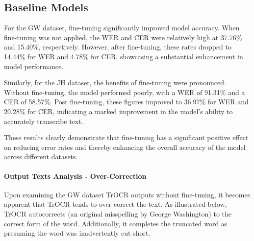 \subsection{Baseline Models}
\label{subsec:5_baseline_models}
For the GW dataset, fine-tuning significantly improved model accuracy. When fine-tuning was not applied, the WER and CER were relatively high at 37.76\% and 15.40\%, respectively. However, after fine-tuning, these rates dropped to 14.44\% for WER and 4.78\% for CER, showcasing a substantial enhancement in model performance.

Similarly, for the JH dataset, the benefits of fine-tuning were pronounced. Without fine-tuning, the model performed poorly, with a WER of 91.31\% and a CER of 58.57\%. Post fine-tuning, these figures improved to 36.97\% for WER and 20.28\% for CER, indicating a marked improvement in the model's ability to accurately transcribe text.

These results clearly demonstrate that fine-tuning has a significant positive effect on reducing error rates and thereby enhancing the overall accuracy of the model across different datasets.


\paragraph*{Output Texts Analysis - Over-Correction} 
Upon examining the GW dataset TrOCR outputs without fine-tuning, it becomes apparent that TrOCR tends to over-correct the text. As illustrated below, TrOCR autocorrects  (an original misspelling by George Washington) to  the correct form of the word. Additionally, it completes the truncated word  as  presuming the word was inadvertently cut short. 

